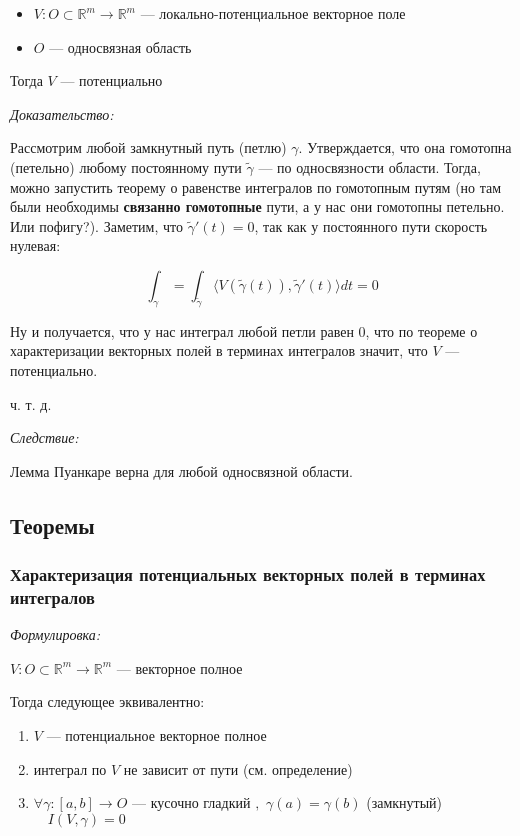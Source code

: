\documentclass{article}
\def\dbl{\,\,}
\def\sk#1#2{\langle #1, #2 \rangle}
\begin{document}
\begin{itemize}
    \item $V: O \subset \mathbb{R}^m \rightarrow \mathbb{R}^m$ --- локально-потенциальное векторное поле
    \item $O$ --- односвязная область 
\end{itemize}

Тогда $V$ --- потенциально

\textit{Доказательство:}

Рассмотрим любой замкнутный путь (петлю) $\gamma$. Утверждается, что она гомотопна (петельно) любому постоянному пути $\tilde{\gamma}$ --- по односвязности области. Тогда, можно запустить теорему о равенстве интегралов по гомотопным путям (но там были необходимы \textbf{связанно гомотопные} пути, а у нас они гомотопны петельно. Или пофигу?). Заметим, что $\tilde{\gamma}'(t) = 0$, так как у постоянного пути скорость нулевая:

\[\int_{\gamma} = \int_{\tilde{\gamma}} \sk{V(\tilde{\gamma}(t))}{\tilde{\gamma}'(t)}dt = 0\]

Ну и получается, что у нас интеграл любой петли равен 0, что по теореме о характеризации векторных полей в терминах интегралов значит, что $V$ --- потенциально.

ч. т. д. 

\textit{Следствие:}

Лемма Пуанкаре верна для любой односвязной области.

\newpage

\subsection{Теоремы}

\subsubsection{Характеризация потенциальных векторных полей в терминах интегралов}
\textit{Формулировка:}

$V: O \subset \mathbb{R}^m \rightarrow \mathbb{R}^m$ --- векторное полное

Тогда следующее эквивалентно:

\begin{enumerate}
    \item $V$ --- потенциальное векторное полное
    \item интеграл по $V$ не зависит от пути (см. определение)
    \item $\forall \gamma : [a, b] \rightarrow O$ --- кусочно гладкий $, \dbl \gamma(a) = \gamma(b) $ (замкнутый) $ \quad I(V, \gamma) = 0$
\end{enumerate}
\end{document}
